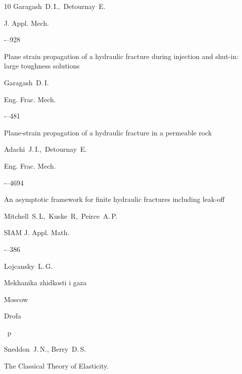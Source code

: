 \begin{thebibliography}{10}
\by   Garagash~D.\,I.,~Detournay~E.

\jour J. Appl. Mech.



-–928




\paper Plane strain propagation of a hydraulic fracture during injection and shut-in: large toughness solutions

\by   Garagash~D.\,I.

\jour Eng. Frac. Mech.



-–481




\paper Plane-strain propagation of a hydraulic fracture in a permeable rock

\by   Adachi~J.\,I.,~Detournay~E.

\jour Eng. Frac. Mech.



-–4694




\paper An asymptotic framework for finite hydraulic fractures including leak-off

\by   Mitchell~S.\,L,~Kuske~R,~Peirce~A.\,P.

\jour SIAM J. Appl. Math.



-–386




\by 	Lojcansky~L.\,G.

\book Mekhanika zhidkosti i gaza

\publaddr Moscow

\publ Drofa


~p




\by 	Sneddon~J.\,N., Berry~D.\,S. 

\book The Classical Theory of Elasticity.


\end{thebibliography}
